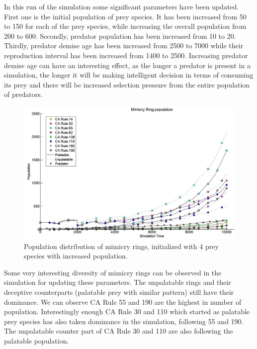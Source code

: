 In this run of the simulation some significant parameters have been updated. First one is the initial population of prey species. It has been increased from 50 to 150 for each of the prey species, while increasing the overall population from 200 to 600. Secondly, predator population has been increased from 10 to 20. Thirdly, predator demise age has been increased from 2500 to 7000 while their reproduction interval has been increased from 1400 to 2500. Increasing predator demise age can have an interesting effect, as the longer a predator is present in a simulation, the longer it will be making intelligent decision in terms of consuming its prey and there will be increased selection pressure from the entire population of predators. 

\begin{figure}[H]
	\centering
	\includegraphics[scale=0.45]{images/simTime10K-4MorePrey}
	\caption[Population distribution of mimicry rings (4 prey species, increased population)]{Population distribution of mimicry rings, initialized with 4 prey species with increased population.}
	\label{fig:plot-4-more-prey}
\end{figure}

Some very interesting diversity of mimicry rings can be observed in the simulation for updating these parameters. The unpalatable rings and their deceptive counterparts (palatable prey with similar pattern) still have their dominance. We can observe CA Rule 55 and 190 are the highest in number of population. Interestingly enough CA Rule 30 and 110 which started as palatable prey species has also taken dominance in the simulation, following 55 and 190. The unpalatable counter part of CA Rule 30 and 110 are also following the palatable population. 

